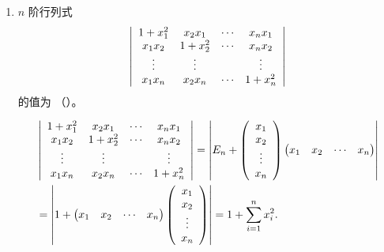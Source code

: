 \begin{enumerate}[1~]
\begin{enumerate}[1.~]
\item
$n$ 阶行列式
$$\left| \begin{array} { c c c c } { 1 + x _ { 1 } ^ { 2 } } & { x _ { 2 } x _ { 1 } } & { \cdots } & { x _ { n } x _ { 1 } } \\ { x _ { 1 } x _ { 2 } } & { 1 + x _ { 2 } ^ { 2 } } & { \cdots } & { x _ { n } x _ { 2 } } \\ { \vdots } & { \vdots } & { } & { \vdots } \\ { x _ { 1 } x _ { n } } & { x _ { 2 } x _ { n } } & { \cdots } & { 1 + x _ { n } ^ { 2 } } \end{array} \right|$$
的值为 （\quad）。
\begin{solution}
\begin{align*}
&\left| \begin{array} { c c c c } { 1 + x _ { 1 } ^ { 2 } } & { x _ { 2 } x _ { 1 } } & { \cdots } & { x _ { n } x _ { 1 } } \\ { x _ { 1 } x _ { 2 } } & { 1 + x _ { 2 } ^ { 2 } } & { \cdots } & { x _ { n } x _ { 2 } } \\ { \vdots } & { \vdots } & { } & { \vdots } \\ { x _ { 1 } x _ { n } } & { x _ { 2 } x _ { n } } & { \cdots } & { 1 + x _ { n } ^ { 2 } } \end{array} \right|
=\left|E_n+\left( \begin{array}{c}
	x_1\\
	x_2\\
	\vdots\\
	x_n\\
\end{array} \right) \left( \begin{matrix}
	x_1&		x_2&		\cdots&		x_n\\
\end{matrix} \right) \right|\\
&=\left|1+\left( \begin{matrix}
	x_1&		x_2&		\cdots&		x_n\\
\end{matrix} \right) \left( \begin{array}{c}
	x_1\\
	x_2\\
	\vdots\\
	x_n\\
\end{array} \right) \right|=1+\sum_{i=1}^n x_i^2.
\end{align*}
\end{solution}


\end{enumerate}
\end{enumerate}
